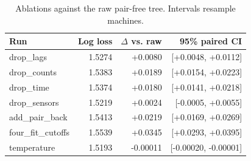\begin{table}[htbp]
\centering\small
\begin{tabular}{@{}lrrr@{}}
\toprule
Run & Log loss & $\Delta$ vs. raw & 95\% paired CI \\
\midrule
drop\_lags & 1.5274 & +0.0080 & [+0.0048, +0.0112] \\
drop\_counts & 1.5383 & +0.0189 & [+0.0154, +0.0223] \\
drop\_time & 1.5374 & +0.0180 & [+0.0141, +0.0218] \\
drop\_sensors & 1.5219 & +0.0024 & [-0.0005, +0.0055] \\
add\_pair\_back & 1.5413 & +0.0219 & [+0.0169, +0.0269] \\
four\_fit\_cutoffs & 1.5539 & +0.0345 & [+0.0293, +0.0395] \\
temperature & 1.5193 & -0.00011 & [-0.00020, -0.00001] \\
\bottomrule
\end{tabular}
\caption{Ablations against the raw pair-free tree. Intervals resample machines.}
\end{table}
